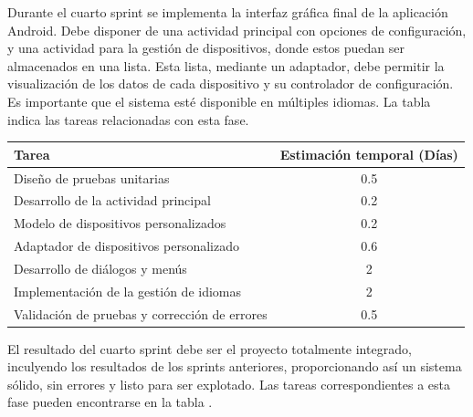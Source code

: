 \documentclass[12pt]{article}
\begin{document}
            Durante el cuarto sprint se implementa la interfaz gráfica final de la aplicación Android. Debe disponer de una actividad principal con opciones de configuración, y una actividad para la gestión de dispositivos, donde estos puedan ser almacenados en una lista. Esta lista, mediante un adaptador, debe permitir la visualización de los datos de cada dispositivo y su controlador de configuración. Es importante que el sistema esté disponible en múltiples idiomas. La tabla  indica las tareas relacionadas con esta fase.

            \begin{tabular}{|l|c|}
                \hline
                \textbf{Tarea}                                                              &   \textbf{Estimación temporal} (Días) \\           
                \hline
                Diseño de pruebas unitarias                                                 &   0.5                                 \\
                Desarrollo de la actividad principal                                        &   0.2                                 \\
                Modelo de dispositivos personalizados                                       &   0.2                                 \\
                Adaptador de dispositivos personalizado                                     &   0.6                                 \\
                Desarrollo de diálogos y menús                                              &   2                                   \\
                Implementación de la gestión de idiomas                                     &   2                                   \\
                Validación de pruebas y corrección de errores                               &   0.5                                 \\
                \hline
            \end{tabular}

            El resultado del cuarto sprint debe ser el proyecto totalmente integrado, inculyendo los resultados de los sprints anteriores, proporcionando así un sistema sólido, sin errores y listo para ser explotado. Las tareas correspondientes a esta fase pueden encontrarse en la tabla .
\end{document}
